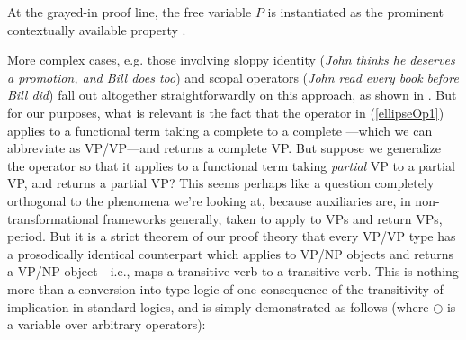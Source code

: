 \documentclass[output=paper,colorlinks,citecolor=brown]{langscibook}
\begin{document}
\noindent At the grayed-in proof line, the free variable $P$ is instantiated as
the prominent contextually available property .

More complex cases, e.g. those involving sloppy identity (\textit{John thinks
he deserves a promotion, and Bill does too}) and scopal operators
(\textit{John read every book before Bill did}) fall out altogether
straightforwardly on this approach, as shown in
\citet[236--238]{kubota-levine-pseudo}. But for our purposes, what is relevant
is the fact that the operator in (\ref{ellipseOp1}) applies to a functional
term taking a complete  to a complete ---which we can
abbreviate as VP/VP---and returns a complete VP. But suppose
we generalize the operator so that it applies to a functional term
taking \textsl{partial} VP to a partial VP, and returns a partial VP?
This seems perhaps like a question completely orthogonal to the
phenomena we're looking at, because auxiliaries are, in
non-transformational frameworks generally, taken to apply to VPs and
return VPs, period. But it is a strict theorem of our proof theory
that every VP/VP type has a prosodically identical counterpart which
applies to VP/NP objects and returns a VP/NP object---i.e., maps a
transitive verb to a transitive verb. This is nothing more than a
conversion into type logic of one consequence of the transitivity of
implication in standard logics, and is simply demonstrated as follows
(where $\bigcirc$ is a variable over arbitrary operators):
\end{document}
